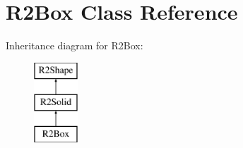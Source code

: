 \hypertarget{class_r2_box}{}\section{R2\+Box Class Reference}
\label{class_r2_box}
Inheritance diagram for R2\+Box\+:\begin{figure}[H]
\begin{center}
\leavevmode
\includegraphics[height=3.000000cm]{class_r2_box}
\end{center}
\end{figure}
